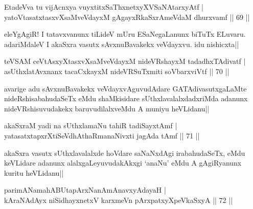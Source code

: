 \begin{shl}
EtadeVva tu vijAcnxya vuyxtitxSaThxnetxyXVSaNAtarxyAtf |\\
yatoV\s tasatxtasxvXsaMveVdayxM gAgayxRkaSxrAmeVdaM dhurxvamf \hfill || 69 ||
\end{shl}

\begin{artha}
eleYgAgiR! I tatavxvanunx tiLideV mUru ESaNegaLanunx biTuTx ELuvaru. adariMdaleV I akaSxra vasutx sAvxnuBavakekx veVdayxvu. idu nishicxta||
\end{artha}


\begin{shl}
teVSAM ceVtAsxyXtasxvXsaMveVdayxM nideVRshayxM tadadhxTAdivatf |\\
asUthxlatAvxnanx tacaCxkayxM nideVRSuTxmiti soV\s barxviVtf \hfill || 70 ||
\end{shl}

\begin{artha}
avarige adu sAvxnuBavakekx veVdayxvAguvudAdare GATAdivasutxgaLaMte nideRshisabahudaSeTx eMdu shaMkisidare sUthxlavalalxdadxriMda adanunx nideVRshisuvudakekx baruvudilalxveMdu A muniyu heVLidanu||
\end{artha}


\begin{shl}
akaSxraM yadi na sUthxlamaNu tahiR tadiSayxtAmf |\\
yatasatxtapxrXtiSeVdhAthaRmanaNivxti jagAda tAmf \hfill || 71 ||
\end{shl}

\begin{artha}
akaSxra vasutx sUthxlavalalxde hoVdare saNaNxdAgi irabahudaSeTx, eMdu keVLidare adanunx alalxgaLeyuvudakAkxgi `anaNu' eMdu A gAgiRyanunx kuritu heVLidanu||
\end{artha}


\begin{shl}
parimANamahABUtapArxNanAmAnavxyAdayaH |\\
kAraNAdAyx niSidhayxnetxV karxmeVn pArxpatxyXpeVkaSxyA \hfill || 72 ||
\end{shl}

